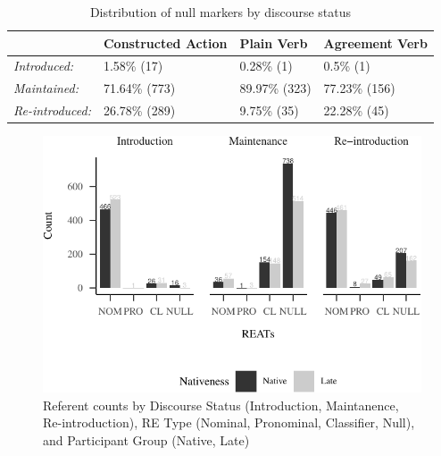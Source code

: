 \documentclass[review]{elsarticle} %
\begin{document}
\begin{table}
\small
\caption{Distribution of null markers by discourse status}
\label{tab:my-table5}
\begin{tabular}{llll}
\hline
                        & Constructed Action & Plain Verb    & Agreement Verb \\ \hline
\textit{Introduced:}    & 1.58\% (17)        & 0.28\% (1)    & 0.5\% (1)      \\
\textit{Maintained:}    & 71.64\% (773)      & 89.97\% (323) & 77.23\% (156)  \\
\textit{Re-introduced:} & 26.78\% (289)      & 9.75\% (35)   & 22.28\% (45)   \\ \hline
\end{tabular}
\end{table}

\begin{figure}
\centering
\includegraphics{manuscript_v2_files/figure-latex/count-plot-1.pdf}
\caption{Referent counts by Discourse Status (Introduction, Maintanence,
Re-introduction), RE Type (Nominal, Pronominal, Classifier, Null), and
Participant Group (Native, Late)}
\end{figure}
\end{document}
